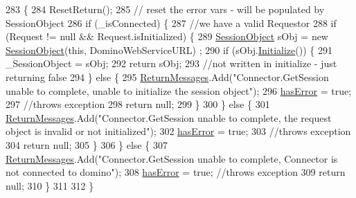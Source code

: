 \begin{DoxyCode}
283                                                                 \{
284         ResetReturn();
285         \textcolor{comment}{// reset the error vars - will be populated by SessionObject}
286         \textcolor{keywordflow}{if} (\_isConnected) \{
287             \textcolor{comment}{//we have a valid Requestor}
288             \textcolor{keywordflow}{if} (Request != null && Request.isInitialized) \{
289                 \mbox{\hyperlink{class_session_object}{SessionObject}} sObj = \textcolor{keyword}{new} \mbox{\hyperlink{class_connector_a0a7bb42f9530796c086ab50785147ce9}{SessionObject}}(\textcolor{keyword}{this}, DominoWebServiceURL)
      ;
290                 \textcolor{keywordflow}{if} (sObj.\mbox{\hyperlink{class_session_object_af3b9c9d56d98c848061952ed935f815b}{Initialize}}()) \{
291                     \_SessionObject = sObj;
292                     \textcolor{keywordflow}{return} sObj;
293                     \textcolor{comment}{//not written in initialize - just returning false}
294                 \} \textcolor{keywordflow}{else} \{
295                     \mbox{\hyperlink{class_connector_a1ed422674b344524fd77998dcf6a9ba6}{ReturnMessages}}.Add(\textcolor{stringliteral}{"Connector.GetSession unable to complete, unable to
       initialize the session object"});
296                     \mbox{\hyperlink{class_connector_a079bae21a5417efa53bfe8954c0f533f}{hasError}} = \textcolor{keyword}{true};
297                     \textcolor{comment}{//throws exception}
298                     \textcolor{keywordflow}{return} null;
299                 \}
300             \} \textcolor{keywordflow}{else} \{
301                 \mbox{\hyperlink{class_connector_a1ed422674b344524fd77998dcf6a9ba6}{ReturnMessages}}.Add(\textcolor{stringliteral}{"Connector.GetSession unable to complete, the request
       object is invalid or not initialized"});
302                 \mbox{\hyperlink{class_connector_a079bae21a5417efa53bfe8954c0f533f}{hasError}} = \textcolor{keyword}{true};
303                 \textcolor{comment}{//throws exception}
304                 \textcolor{keywordflow}{return} null;
305             \}
306         \} \textcolor{keywordflow}{else} \{
307             \mbox{\hyperlink{class_connector_a1ed422674b344524fd77998dcf6a9ba6}{ReturnMessages}}.Add(\textcolor{stringliteral}{"Connector.GetSession unable to complete, Connector is not
       connected to domino"});
308             \mbox{\hyperlink{class_connector_a079bae21a5417efa53bfe8954c0f533f}{hasError}} = \textcolor{keyword}{true};  \textcolor{comment}{//throws exception}
309             \textcolor{keywordflow}{return} null;
310         \}
311 
312     \}
\end{DoxyCode}
\mbox{\label{class_connector_a376c1ed70efd33d0bb18bb36e5cf076e}} 

